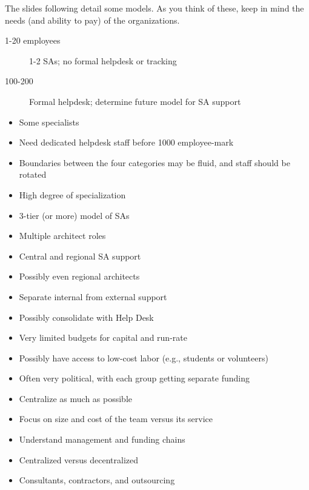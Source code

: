 \documentclass{slides}
\newcommand{\bi}{\begin{itemize}}
\newcommand{\ei}{\end{itemize}}
\newcommand{\bd}{\begin{description}}
\newcommand{\ed}{\end{description}}
\begin{document}
The slides following detail some models.  As you think of these,
keep in mind the needs (and ability to pay) of the organizations.


\bd
\item[1-20 employees] 1-2 SAs; no formal helpdesk or tracking
\item[100-200] Formal helpdesk; determine future model for SA support
\ed


\bi
\item Some specialists
\item Need dedicated helpdesk staff before 1000 employee-mark
\item Boundaries between the four categories may be fluid, and
  staff should be rotated
\ei


\bi
\item High degree of specialization
\item 3-tier (or more) model of SAs
\item Multiple architect roles
\item Central and regional SA support
\item Possibly even regional architects
\ei


\bi
\item Separate internal from external support
\item Possibly consolidate with Help Desk
\ei


\bi
\item Very limited budgets for capital and run-rate
\item Possibly have access to low-cost labor (e.g., students or
  volunteers)
\item Often very political, with each group getting separate funding
\item Centralize as much as possible
\ei


\bi
\item Focus on size and cost of the team versus its service
\item Understand management and funding chains 
\item Centralized versus decentralized
\item Consultants, contractors, and outsourcing
\ei
\end{document}
